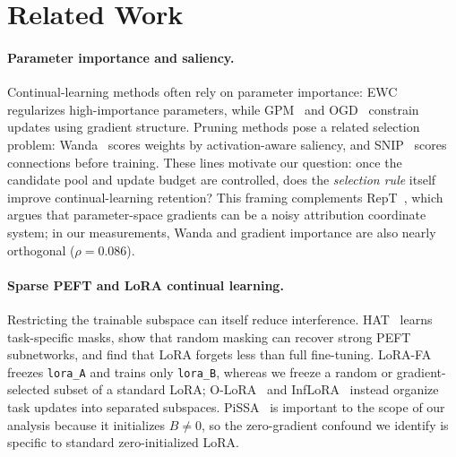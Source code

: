 \section{Related Work}
\label{sec:related}

\paragraph{Parameter importance and saliency.}
Continual-learning methods often rely on parameter importance: EWC~\citep{kirkpatrick2017overcoming} regularizes high-importance parameters, while GPM~\citep{saha2021gpm} and OGD~\citep{farajtabar2020ogd} constrain updates using gradient structure. Pruning methods pose a related selection problem: Wanda~\citep{sun2024wanda} scores weights by activation-aware saliency, and SNIP~\citep{lee2019snip} scores connections before training. These lines motivate our question: once the candidate pool and update budget are controlled, does the \emph{selection rule} itself improve continual-learning retention? This framing complements RepT~\citep{li2026rept}, which argues that parameter-space gradients can be a noisy attribution coordinate system; in our measurements, Wanda and gradient importance are also nearly orthogonal ($\rho=0.086$).

\paragraph{Sparse PEFT and LoRA continual learning.}
Restricting the trainable subspace can itself reduce interference. HAT~\citep{serra2018hat} learns task-specific masks, \citet{su2024random} show that random masking can recover strong PEFT subnetworks, and \citet{biderman2024lora} find that LoRA forgets less than full fine-tuning. LoRA-FA~\citep{zhang2023lorafa} freezes \texttt{lora\_A} and trains only \texttt{lora\_B}, whereas we freeze a random or gradient-selected subset of a standard LoRA; O-LoRA~\citep{wang2023olora} and InfLoRA~\citep{liang2024inflora} instead organize task updates into separated subspaces. PiSSA~\citep{meng2024pissa} is important to the scope of our analysis because it initializes $B\neq0$, so the zero-gradient confound we identify is specific to standard zero-initialized LoRA.

